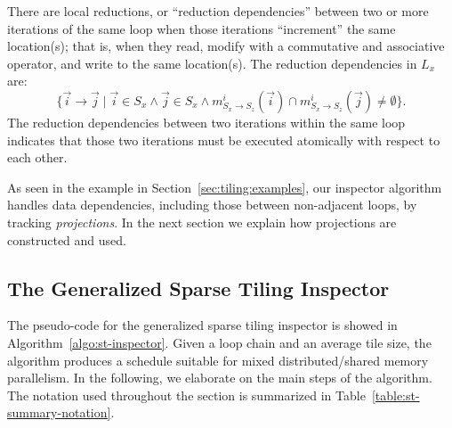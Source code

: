 There are local reductions, or ``reduction dependencies'' between two or more iterations of the same loop when those iterations ``increment'' the same location(s); that is, when they read, modify with a commutative and associative operator, and write to the same location(s). The reduction dependencies in $L_x$ are:
\[
	\{ \vec{i} \rightarrow \vec{j} \; | \; \vec{i} \in S_x \wedge \vec{j} \in S_x \wedge m_{S_x\rightarrow S_z}^{i}(\vec{i}) \cap m_{S_x \rightarrow S_z}^{i}(\vec{j}) \ne \emptyset \}.
\]
The reduction dependencies between two iterations within the same loop indicates that those two iterations must be executed atomically with respect to each other.

As seen in the example in Section~\ref{sec:tiling:examples}, our inspector algorithm handles data dependencies, including those between non-adjacent loops, by tracking \textit{projections}. In the next section we explain how projections are constructed and used.



\subsection{The Generalized Sparse Tiling Inspector}
\label{sec:tiling:inspector}

The pseudo-code for the generalized sparse tiling inspector is showed in Algorithm~\ref{algo:st-inspector}. Given a loop chain and an average tile size, the algorithm produces a schedule suitable for mixed distributed/shared memory parallelism. In the following, we elaborate on the main steps of the algorithm. The notation used throughout the section is summarized in Table~\ref{table:st-summary-notation}.

